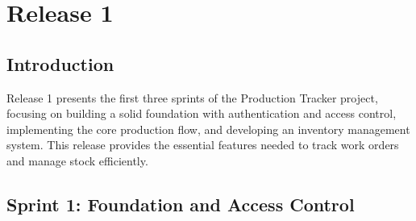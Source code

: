 \chapter{Release 1}
\label{chap:release1}

\section{Introduction}
\label{sec:release1-intro}

Release 1 presents the first three sprints of the Production Tracker project, focusing on building a solid foundation with authentication and access control, implementing the core production flow, and developing an inventory management system. This release provides the essential features needed to track work orders and manage stock efficiently.

\section{Sprint 1: Foundation and Access Control}
\label{sec:sprint1}

